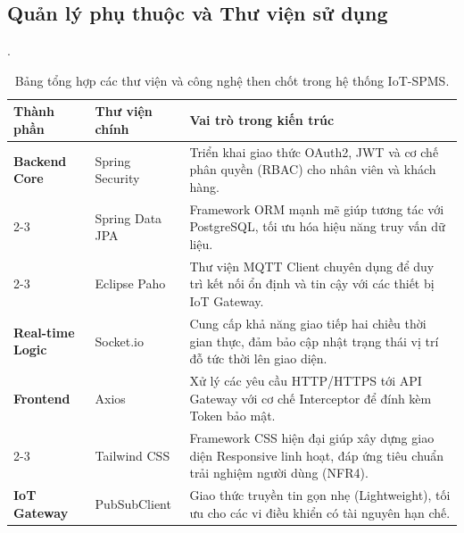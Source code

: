 \subsection{Quản lý phụ thuộc và Thư viện sử dụng}
.

\begin{table}[H]
\centering
\renewcommand{\arraystretch}{1.3}
\begin{tabularx}{\textwidth}{|l|l|X|}
\hline
\rowcolor[HTML]{EFEFEF} 
\textbf{Thành phần} & \textbf{Thư viện chính} & \textbf{Vai trò trong kiến trúc} \\ \hline
\textbf{Backend Core} & Spring Security & Triển khai giao thức OAuth2, JWT và cơ chế phân quyền (RBAC) cho nhân viên và khách hàng. \\ \cline{2-3} 
 & Spring Data JPA & Framework ORM mạnh mẽ giúp tương tác với PostgreSQL, tối ưu hóa hiệu năng truy vấn dữ liệu. \\ \cline{2-3} 
 & Eclipse Paho & Thư viện MQTT Client chuyên dụng để duy trì kết nối ổn định và tin cậy với các thiết bị IoT Gateway. \\ \hline
\textbf{Real-time Logic} & Socket.io & Cung cấp khả năng giao tiếp hai chiều thời gian thực, đảm bảo cập nhật trạng thái vị trí đỗ tức thời lên giao diện. \\ \hline
\textbf{Frontend} & Axios & Xử lý các yêu cầu HTTP/HTTPS tới API Gateway với cơ chế Interceptor để đính kèm Token bảo mật. \\ \cline{2-3} 
 & Tailwind CSS & Framework CSS hiện đại giúp xây dựng giao diện Responsive linh hoạt, đáp ứng tiêu chuẩn trải nghiệm người dùng (NFR4). \\ \hline
\textbf{IoT Gateway} & PubSubClient & Giao thức truyền tin gọn nhẹ (Lightweight), tối ưu cho các vi điều khiển có tài nguyên hạn chế. \\ \hline
\end{tabularx}
\caption{Bảng tổng hợp các thư viện và công nghệ then chốt trong hệ thống IoT-SPMS.}
\end{table}





